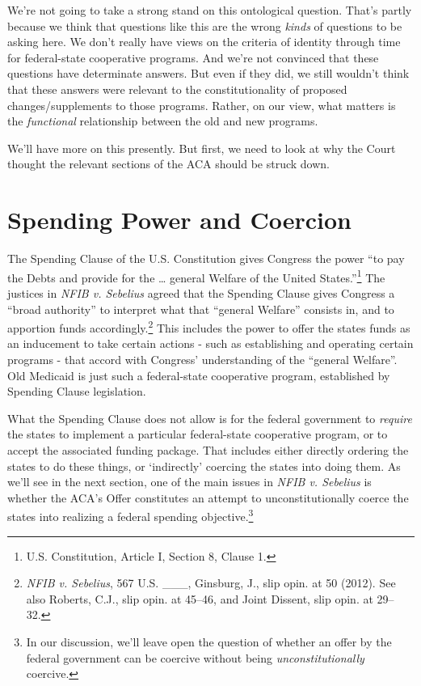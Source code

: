 We're not going to take a strong stand on this ontological question. That's partly because we think that questions like this are the wrong \emph{kinds} of questions to be asking here. We don't really have views on the criteria of identity through time for federal-state cooperative programs. And we're not convinced that these questions have determinate answers. But even if they did, we still wouldn't think that these answers were relevant to the constitutionality of proposed changes\slash supplements to those programs. Rather, on our view, what matters is the \emph{functional }relationship between the old and new programs.

We'll have more on this presently. But first, we need to look at why the Court thought the relevant sections of the ACA should be struck down.

\section{Spending Power and Coercion
}
The Spending Clause of the U.S. Constitution gives Congress the power ``to pay the Debts and provide for the {\ldots} general Welfare of the United States.''\footnote{U.S. Constitution, Article I, Section 8, Clause 1.} The justices in \emph{NFIB v. Sebelius }agreed that the Spending Clause gives Congress a ``broad authority'' to interpret what that ``general Welfare'' consists in, and to apportion funds accordingly.\footnote{\emph{NFIB v. Sebelius}, 567 U.S. \_\_\_, Ginsburg, J., slip opin. at 50 (2012). See also Roberts, C.J., slip opin. at 45--46, and Joint Dissent, slip opin. at 29--32.} This includes the power to offer the states funds as an inducement to take certain actions - such as establishing and operating certain programs - that accord with Congress' understanding of the ``general Welfare''. Old Medicaid is just such a federal-state cooperative program, established by Spending Clause legislation.

What the Spending Clause does not allow is for the federal government to \emph{require }the states to implement a particular federal-state cooperative program, or to accept the associated funding package. That includes either directly ordering the states to do these things, or `indirectly' coercing the states into doing them. As we'll see in the next section, one of the main issues in \emph{NFIB v. Sebelius} is whether the ACA's Offer constitutes an attempt to unconstitutionally coerce the states into realizing a federal spending objective.\footnote{In our discussion, we'll leave open the question of whether an offer by the federal government can be coercive without being \textit{unconstitutionally} coercive.} 

